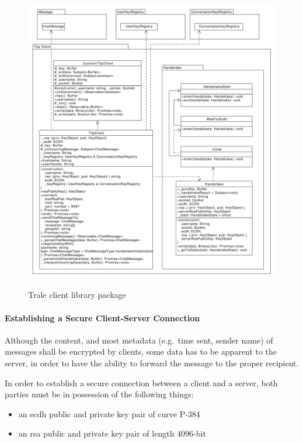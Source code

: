 \begin{figure}[H]
    \centering
    \caption{Trale client library package}
    \hspace*{-2.9cm}
    \includegraphics[width=1.3\textwidth]{./graphics/classDiagramTransportLibrary-TitpClient}
    \label{fig:figure37}
\end{figure}

\paragraph{Establishing a Secure Client-Server Connection}
Although the content, and most metadata (e.g.\ time sent, sender name) of messages shall be encrypted by clients, some
data has to be apparent to the server, in order to have the ability to forward the message to the proper recipient.

In order to establish a secure connection between a client and a server, both parties must be in possession of the
following things:

\begin{itemize}
    \setlength\itemsep{-.5em}
    \item an \ac{ecdh} public and private key pair of curve P-384~\cite{nist-digital-signature-standard}
    \item an \ac{rsa} public and private key pair of length 4096-bit
\end{itemize}

